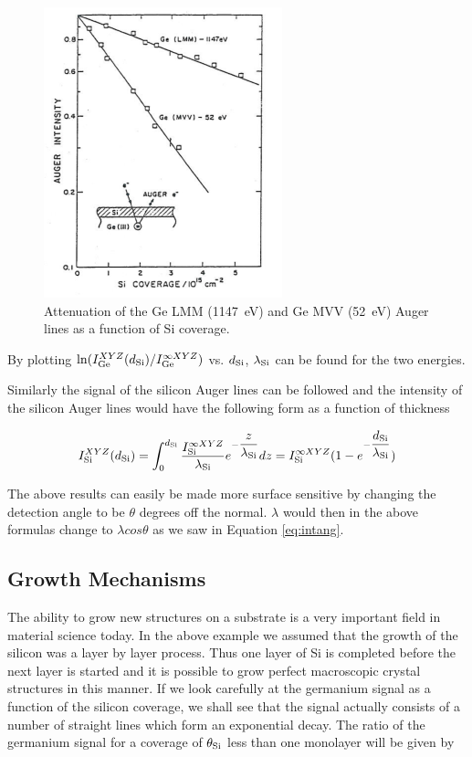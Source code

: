 \begin{figure}[h!]
	\begin{center}
	\includegraphics[scale=4.5]{figures/06_14.png}
	\caption{Attenuation of the Ge LMM (\SI{1147}{\electronvolt}) and Ge MVV (\SI{52}{\electronvolt}) Auger lines as a function of Si coverage.}
	\label{fig:gemvv}
	\end{center}
\end{figure}

By plotting $\ln(I^{XYZ}_{\ce{Ge}}(d_{\ce{Si}})/I^{\infty XYZ}_{\ce{Ge}})$ vs. $d_{\ce{Si}}$,  $\lambda_{\ce{Si}}$ can be found for the two energies.

Similarly the signal of the silicon Auger lines can be followed and the intensity of the silicon Auger lines would have the following form as a function of thickness

\begin{equation}\label{eq:sisignal}
I^{XYZ}_{\ce{Si}}(d_{\ce{Si}})=\int_0^{d_{\ce{Si}}}\frac{I^{\infty XYZ}_{\ce{Si}}}{\lambda_{\ce{Si}}}e^{-\dfrac{z}{\lambda_{\ce{Si}}}}dz=I^{\infty XYZ}_{\ce{Si}}(1-e^{-\dfrac{d_{\ce{Si}}}{\lambda_{\ce{Si}}}})
\end{equation}
          
The above results can easily be made more surface sensitive by changing the detection angle to be $\theta$ degrees off the normal. $\lambda$ would then in the above formulas change to $\lambda cos\theta$ as we saw in Equation \eqref{eq:intang}.

\subsection{Growth Mechanisms}
The ability to grow new structures on a substrate is a very important field in material science today. In the above example we assumed that the growth of the silicon was a layer by layer process. Thus one layer of Si is completed before the next layer is started and it is possible to grow perfect macroscopic crystal structures in this manner. If we look carefully at the germanium signal as a function of the silicon coverage, we shall see that the signal actually consists of a number of straight lines which form an exponential decay. The ratio of the germanium signal for a coverage of $\theta_{\ce{Si}}$ less than one monolayer will be given by

